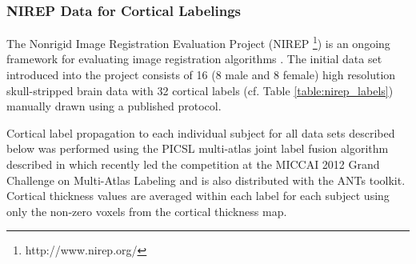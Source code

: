 %
%

\subsubsection{NIREP Data for Cortical Labelings}

The Nonrigid Image Registration Evaluation Project (NIREP%
\footnote{
http://www.nirep.org/
}) 
is an ongoing framework for evaluating image registration algorithms \citep{christensen2006}.
The initial data set introduced into the project consists of 
16 (8 male and 8 female) high resolution skull-stripped brain 
data with 32 cortical labels (cf. Table \ref{table:nirep_labels}) manually drawn using a 
published protocol.

Cortical label propagation to each individual subject for all data sets
described below was performed using the PICSL multi-atlas joint label fusion
algorithm described in \cite{wang2013} which recently led the competition
at the MICCAI 2012 Grand Challenge on Multi-Atlas Labeling and is also 
distributed with the ANTs toolkit.  Cortical thickness values are averaged
within each label for each subject using only the non-zero voxels from the cortical thickness map.

